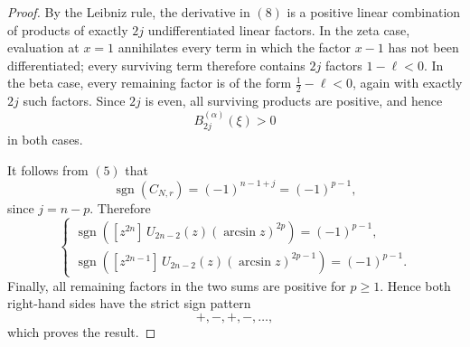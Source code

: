 \documentclass[11pt,twoside]{article}
\numberwithin{equation}{section}
\begin{document}
\begin{proof}
By the Leibniz rule, the derivative in \((8)\) is a positive linear
combination of products of exactly \(2j\) undifferentiated linear
factors. In the zeta case, evaluation at \(x=1\) annihilates every term
in which the factor \(x-1\) has not been differentiated; every surviving
term therefore contains \(2j\) factors \(1-\ell<0\). In the beta case,
every remaining factor is of the form \(\frac12-\ell<0\), again with
exactly \(2j\) such factors. Since \(2j\) is even, all surviving products
are positive, and hence
\[
B_{2j}^{(\alpha)}(\xi)>0
\]
in both cases.

It follows from \((5)\) that
\[
\operatorname{sgn}(C_{N,r})
=
(-1)^{n-1+j}
=
(-1)^{p-1},
\]
since \(j=n-p\). Therefore
\[
\begin{cases}
\displaystyle
\operatorname{sgn}
\left(
[z^{2n}]\,U_{2n-2}(z)(\arcsin z)^{2p}
\right)
=
(-1)^{p-1},
\\[3mm]
\displaystyle
\operatorname{sgn}
\left(
[z^{2n-1}]\,U_{2n-2}(z)(\arcsin z)^{2p-1}
\right)
=
(-1)^{p-1}.
\end{cases}
\]
Finally, all remaining factors in the two sums are positive for
\(p\geq1\). Hence both right-hand sides have the strict sign pattern
\[
+,-,+,-,\ldots,
\]
which proves the result.
\end{proof}
\end{document}
